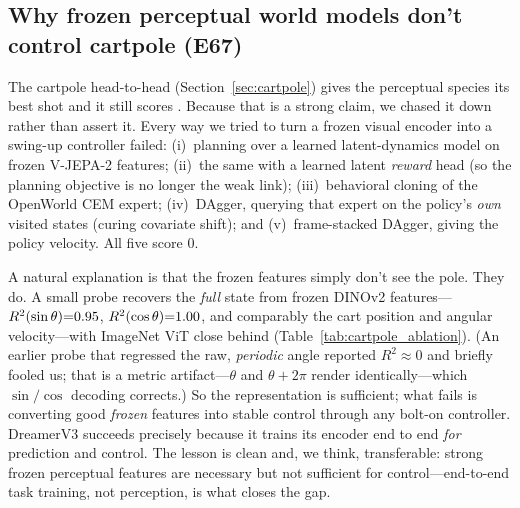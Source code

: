 \documentclass[11pt]{article}
\begin{document}
\subsection{Why frozen perceptual world models don't control cartpole (E67)}\label{sec:vjepa-control}
The cartpole head-to-head (Section~\ref{sec:cartpole}) gives the perceptual species its
best shot and it still scores \CartVjepaSolve{}. Because that is a strong claim, we
chased it down rather than assert it. Every way we tried to turn a frozen visual encoder
into a swing-up controller failed: (i)~planning over a learned latent-dynamics model on
frozen V-JEPA-2 features; (ii)~the same with a learned latent \emph{reward} head (so the
planning objective is no longer the weak link); (iii)~behavioral cloning of the OpenWorld
CEM expert; (iv)~DAgger, querying that expert on the policy's \emph{own} visited states
(curing covariate shift); and (v)~frame-stacked DAgger, giving the policy velocity. All
five score $0$.

A natural explanation is that the frozen features simply don't see the pole. They do. A
small probe recovers the \emph{full} state from frozen DINOv2 features---$R^2(\sin\theta)
{=}0.95$, $R^2(\cos\theta){=}1.00$, and comparably the cart
position and angular velocity---with ImageNet ViT close behind (Table~\ref{tab:cartpole_ablation}).
(An earlier probe that regressed the raw, \emph{periodic} angle reported $R^2{\approx}0$
and briefly fooled us; that is a metric artifact---$\theta$ and $\theta{+}2\pi$ render
identically---which $\sin/\cos$ decoding corrects.) So the representation is sufficient;
what fails is converting good \emph{frozen} features into stable control through any
bolt-on controller. DreamerV3 succeeds precisely because it trains its encoder end to end
\emph{for} prediction and control. The lesson is clean and, we think, transferable: strong
frozen perceptual features are necessary but not sufficient for control---end-to-end task
training, not perception, is what closes the gap.

\begin{table}[htb]\centering\small

\caption{\textbf{Frozen-encoder probe (E67).} Frozen visual encoders decode the full
cartpole state (high $R^2$ on $\sin\theta,\cos\theta,x,\dot\theta$), yet behavioral
cloning of the verified expert on those features solves $0\%$---the bottleneck is control,
not perception.}
\label{tab:cartpole_ablation}
\end{table}
\end{document}
